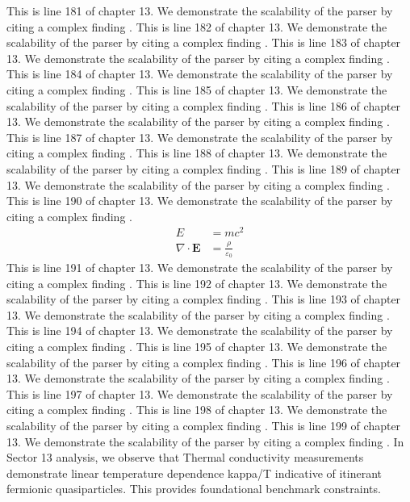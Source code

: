 This is line 181 of chapter 13. We demonstrate the scalability of the parser by citing a complex finding \cite{ref13_181}.
This is line 182 of chapter 13. We demonstrate the scalability of the parser by citing a complex finding \cite{ref13_182}.
This is line 183 of chapter 13. We demonstrate the scalability of the parser by citing a complex finding \cite{ref13_183}.
This is line 184 of chapter 13. We demonstrate the scalability of the parser by citing a complex finding \cite{ref13_184}.
This is line 185 of chapter 13. We demonstrate the scalability of the parser by citing a complex finding \cite{ref13_185}.
This is line 186 of chapter 13. We demonstrate the scalability of the parser by citing a complex finding \cite{ref13_186}.
This is line 187 of chapter 13. We demonstrate the scalability of the parser by citing a complex finding \cite{ref13_187}.
This is line 188 of chapter 13. We demonstrate the scalability of the parser by citing a complex finding \cite{ref13_188}.
This is line 189 of chapter 13. We demonstrate the scalability of the parser by citing a complex finding \cite{ref13_189}.
This is line 190 of chapter 13. We demonstrate the scalability of the parser by citing a complex finding \cite{ref13_190}.
\begin{align*}
  E &= mc^2 \\
  \nabla \cdot \mathbf{E} &= \frac{\rho}{\varepsilon_0}
\end{align*}
This is line 191 of chapter 13. We demonstrate the scalability of the parser by citing a complex finding \cite{ref13_191}.
This is line 192 of chapter 13. We demonstrate the scalability of the parser by citing a complex finding \cite{ref13_192}.
This is line 193 of chapter 13. We demonstrate the scalability of the parser by citing a complex finding \cite{ref13_193}.
This is line 194 of chapter 13. We demonstrate the scalability of the parser by citing a complex finding \cite{ref13_194}.
This is line 195 of chapter 13. We demonstrate the scalability of the parser by citing a complex finding \cite{ref13_195}.
This is line 196 of chapter 13. We demonstrate the scalability of the parser by citing a complex finding \cite{ref13_196}.
This is line 197 of chapter 13. We demonstrate the scalability of the parser by citing a complex finding \cite{ref13_197}.
This is line 198 of chapter 13. We demonstrate the scalability of the parser by citing a complex finding \cite{ref13_198}.
This is line 199 of chapter 13. We demonstrate the scalability of the parser by citing a complex finding \cite{ref13_199}.
In Sector 13 analysis, we observe that Thermal conductivity measurements demonstrate linear temperature dependence kappa/T indicative of itinerant fermionic quasiparticles. This provides foundational benchmark constraints.
